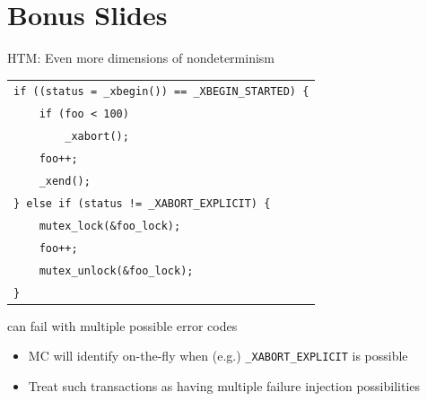 \documentclass[xcolor=dvipsnames]{beamer}
\begin{document}

\section{Bonus Slides}

\begin{frame}{HTM: Even more dimensions of nondeterminism}
	\begin{center}
		\begin{tabular}{l}
			\texttt{if ((status = \_xbegin()) == \_XBEGIN\_STARTED) \{} \\
			\texttt{~~~~if (foo < 100)}\\
			\texttt{~~~~~~~~\_xabort();} \\
			\texttt{~~~~foo++;} \\
			\texttt{~~~~\_xend();} \\
			\texttt{\} else if (status != \_XABORT\_EXPLICIT) \{} \\
			\texttt{~~~~mutex\_lock(\&foo\_lock);} \\
			\texttt{~~~~foo++;} \\
			\texttt{~~~~mutex\_unlock(\&foo\_lock);} \\
			\texttt{\}} \\
		\end{tabular}
	\end{center}
	\linegap

	\xbegin can fail with multiple possible error codes
	\begin{itemize}
		\item MC will identify on-the-fly when (e.g.) {\tt \_XABORT\_EXPLICIT} is possible
		\item Treat such transactions as having multiple failure injection possibilities
	\end{itemize}
\end{frame}
\end{document}
